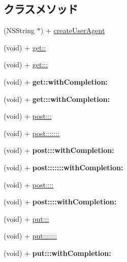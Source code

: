 \subsection*{クラスメソッド}
\begin{DoxyCompactItemize}
\item 
(N\+S\+String $\ast$) + \hyperlink{interface_request_a43015692dbd92de3c836ba459e90c0cf}{create\+User\+Agent}
\item 
(void) + \hyperlink{interface_request_a1ad0efd466263ff21838ff5ac5108f05}{get\+::}
\item 
(void) + \hyperlink{interface_request_ace049cf2313f60da0f2febf41e573841}{get\+:::}
\item 
\hypertarget{interface_request_a5dc81864b82ab464c60535eaf62a1571}{}(void) + {\bfseries get\+::with\+Completion\+:}\label{interface_request_a5dc81864b82ab464c60535eaf62a1571}

\item 
\hypertarget{interface_request_acaac272a93372b4f9a543b1292a63f1a}{}(void) + {\bfseries get\+:::with\+Completion\+:}\label{interface_request_acaac272a93372b4f9a543b1292a63f1a}

\item 
(void) + \hyperlink{interface_request_ae0abcbb748a19888961803404a98312b}{post\+:::}
\item 
(void) + \hyperlink{interface_request_aa0933429cb0282c66445a532fbb2db01}{post\+:::::::}
\item 
\hypertarget{interface_request_a09dd0ca7300b90eb73a9b577d1f819ac}{}(void) + {\bfseries post\+:::with\+Completion\+:}\label{interface_request_a09dd0ca7300b90eb73a9b577d1f819ac}

\item 
\hypertarget{interface_request_a20432bbf20777f0d77d2ac4cf83878cb}{}(void) + {\bfseries post\+:::::::with\+Completion\+:}\label{interface_request_a20432bbf20777f0d77d2ac4cf83878cb}

\item 
(void) + \hyperlink{interface_request_a63c05c3f561efe3713ecdfb0cb193e83}{post\+::::}
\item 
\hypertarget{interface_request_a8b74c8c0e8d7bd0bd13cce0d97823691}{}(void) + {\bfseries post\+::::with\+Completion\+:}\label{interface_request_a8b74c8c0e8d7bd0bd13cce0d97823691}

\item 
(void) + \hyperlink{interface_request_a1d631650d854672c933bbfc3107ac938}{put\+:::}
\item 
(void) + \hyperlink{interface_request_a9eda953d778836c2399fca3cf831d2e6}{put\+:::::::}
\item 
\hypertarget{interface_request_a4f0c2585203e53b82403fec1fdb19745}{}(void) + {\bfseries put\+:::with\+Completion\+:}\label{interface_request_a4f0c2585203e53b82403fec1fdb19745}


\end{DoxyCompactItemize}
